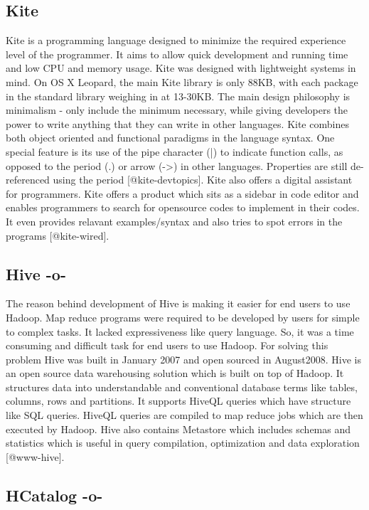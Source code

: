 \subsection{Kite}

Kite is a programming language designed to minimize the required
experience level of the programmer.  It aims to allow quick
development and running time and low CPU and memory usage. Kite was
designed with lightweight systems in mind.  On OS X Leopard, the main
Kite library is only 88KB, with each package in the standard library
weighing in at 13-30KB. The main design philosophy is minimalism -
only include the minimum necessary, while giving developers the power
to write anything that they can write in other languages. Kite
combines both object oriented and functional paradigms in the language
syntax.  One special feature is its use of the pipe character (|) to
indicate function calls, as opposed to the period (.) or arrow (->) in
other languages.  Properties are still de-referenced using the
period [@kite-devtopics]. Kite also offers a digital assistant for
programmers. Kite offers a product which sits as a sidebar in code
editor and enables programmers to search for opensource codes to
implement in their codes. It even provides relavant examples/syntax
and also tries to spot errors in the programs [@kite-wired].
     
\subsection{Hive -o-}
     
The reason behind development of Hive is making it easier for end
users to use Hadoop. Map reduce programs were required to be developed
by users for simple to complex tasks. It lacked expressiveness like
query language. So, it was a time consuming and difficult task for end
users to use Hadoop. For solving this problem Hive was built in
January 2007 and open sourced in August2008.  Hive is an open source
data warehousing solution which is built on top of Hadoop. It
structures data into understandable and conventional database terms
like tables, columns, rows and partitions. It supports HiveQL queries
which have structure like SQL queries. HiveQL queries are compiled to
map reduce jobs which are then executed by Hadoop.  Hive also contains
Metastore which includes schemas and statistics which is useful in
query compilation, optimization and data exploration [@www-hive].



\subsection{HCatalog -o-}



